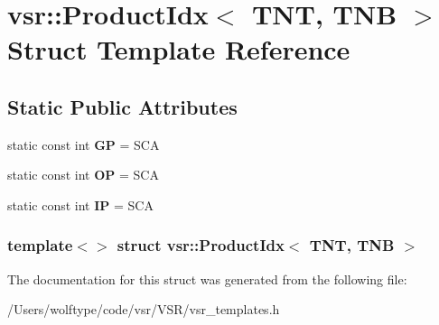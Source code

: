 \hypertarget{structvsr_1_1_product_idx_3_01_t_n_t_00_01_t_n_b_01_4}{\section{vsr\-:\-:Product\-Idx$<$ T\-N\-T, T\-N\-B $>$ Struct Template Reference}
\label{structvsr_1_1_product_idx_3_01_t_n_t_00_01_t_n_b_01_4}
}
\subsection*{Static Public Attributes}
\begin{DoxyCompactItemize}
\item 
\hypertarget{structvsr_1_1_product_idx_3_01_t_n_t_00_01_t_n_b_01_4_a70760e0fababc982e7d7fdda0b35298d}{static const int {\bfseries G\-P} = S\-C\-A}\label{structvsr_1_1_product_idx_3_01_t_n_t_00_01_t_n_b_01_4_a70760e0fababc982e7d7fdda0b35298d}

\item 
\hypertarget{structvsr_1_1_product_idx_3_01_t_n_t_00_01_t_n_b_01_4_a085fefca0e0550b0844f3bd5159a8f95}{static const int {\bfseries O\-P} = S\-C\-A}\label{structvsr_1_1_product_idx_3_01_t_n_t_00_01_t_n_b_01_4_a085fefca0e0550b0844f3bd5159a8f95}

\item 
\hypertarget{structvsr_1_1_product_idx_3_01_t_n_t_00_01_t_n_b_01_4_a7c7bb9e8b576ed81affa379c97633798}{static const int {\bfseries I\-P} = S\-C\-A}\label{structvsr_1_1_product_idx_3_01_t_n_t_00_01_t_n_b_01_4_a7c7bb9e8b576ed81affa379c97633798}

\end{DoxyCompactItemize}
\subsubsection*{template$<$$>$ struct vsr\-::\-Product\-Idx$<$ T\-N\-T, T\-N\-B $>$}



The documentation for this struct was generated from the following file\-:\begin{DoxyCompactItemize}
\item 
/\-Users/wolftype/code/vsr/\-V\-S\-R/vsr\-\_\-templates.\-h\end{DoxyCompactItemize}
